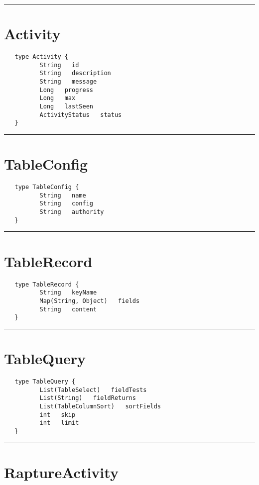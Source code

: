 \rule{12cm}{2pt}
\section{Activity}
\label{type:Activity}

\begin{verbatim}
   type Activity {
          String   id
          String   description
          String   message
          Long   progress
          Long   max
          Long   lastSeen
          ActivityStatus   status
   }
\end{verbatim}

\rule{12cm}{2pt}
\section{TableConfig}
\label{type:TableConfig}

\begin{verbatim}
   type TableConfig {
          String   name
          String   config
          String   authority
   }
\end{verbatim}

\rule{12cm}{2pt}
\section{TableRecord}
\label{type:TableRecord}

\begin{verbatim}
   type TableRecord {
          String   keyName
          Map(String, Object)   fields
          String   content
   }
\end{verbatim}

\rule{12cm}{2pt}
\section{TableQuery}
\label{type:TableQuery}

\begin{verbatim}
   type TableQuery {
          List(TableSelect)   fieldTests
          List(String)   fieldReturns
          List(TableColumnSort)   sortFields
          int   skip
          int   limit
   }
\end{verbatim}

\rule{12cm}{2pt}
\section{RaptureActivity}
\label{type:RaptureActivity}


